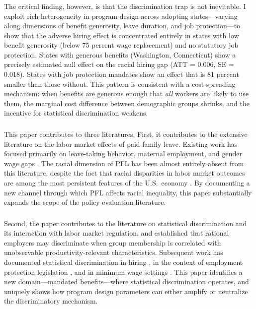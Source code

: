 \documentclass[12pt]{article}
\begin{document}
\subsubsection*{}
The critical finding, however, is that the discrimination trap is not inevitable. I exploit rich heterogeneity in program design across adopting states---varying along dimensions of benefit generosity, leave duration, and job protection---to show that the adverse hiring effect is concentrated entirely in states with low benefit generosity (below 75 percent wage replacement) and no statutory job protection. States with generous benefits (Washington, Connecticut) show a precisely estimated null effect on the racial hiring gap (ATT = 0.006, SE = 0.018). States with job protection mandates show an effect that is 81 percent smaller than those without. This pattern is consistent with a cost-spreading mechanism: when benefits are generous enough that \textit{all} workers are likely to use them, the marginal cost difference between demographic groups shrinks, and the incentive for statistical discrimination weakens.

\subsubsection*{}
This paper contributes to three literatures. First, it contributes to the extensive literature on the labor market effects of paid family leave. Existing work has focused primarily on leave-taking behavior, maternal employment, and gender wage gaps \citep{rossinslater2013, baum2016, bailey2019, dahl2014}. The racial dimension of PFL has been almost entirely absent from this literature, despite the fact that racial disparities in labor market outcomes are among the most persistent features of the U.S.\ economy \citep{altonji1999, charles2008}. By documenting a new channel through which PFL affects racial inequality, this paper substantially expands the scope of the policy evaluation literature.

\subsubsection*{}
Second, the paper contributes to the literature on statistical discrimination and its interaction with labor market regulation. \citet{phelps1972} and \citet{arrow1973} established that rational employers may discriminate when group membership is correlated with unobservable productivity-relevant characteristics. Subsequent work has documented statistical discrimination in hiring \citep{bertrand2004}, in the context of employment protection legislation \citep{neumark2006}, and in minimum wage settings \citep{autor2019}. This paper identifies a new domain---mandated benefits---where statistical discrimination operates, and uniquely shows how program design parameters can either amplify or neutralize the discriminatory mechanism.
\end{document}
